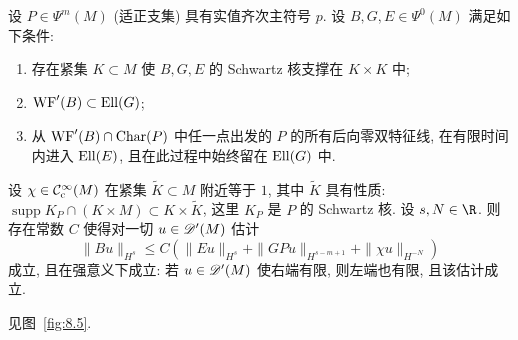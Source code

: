 \begin{corollary}[半整体传播估计]\label{cor:8.19}
设 $P \in \Psi^m(M)$ (适正支集) 具有实值齐次主符号 $p$. 设 $B, G, E \in \Psi^0(M)$ 满足如下条件:
\begin{enumerate}
    \item 存在紧集 $K \subset M$ 使 $B, G, E$ 的 Schwartz 核支撑在 $K \times K$ 中;
    \item $\operatorname{WF}'(B) \subset \operatorname{Ell}(G)$;
    \item 从 $\operatorname{WF}'(B) \cap \operatorname{Char}(P)$ 中任一点出发的 $P$ 的所有后向零双特征线, 在有限时间内进入 $\operatorname{Ell}(E)$, 且在此过程中始终留在 $\operatorname{Ell}(G)$ 中.
\end{enumerate}
设 $\chi \in \mathcal{C}_{\mathrm{c}}^\infty(M)$ 在紧集 $\tilde{K} \subset M$ 附近等于 $1$, 其中 $\tilde{K}$ 具有性质: $\operatorname{supp}K_P \cap (K \times M) \subset K \times \tilde{K}$, 这里 $K_P$ 是 $P$ 的 Schwartz 核. 设 $s, N \in \R$. 则存在常数 $C$ 使得对一切 $u \in \mathscr{D}'(M)$ 估计
\begin{equation}\label{eq:8.76}
    \| B u \|_{H^s} \le C\left( \| E u \|_{H^s} + \| G P u \|_{H^{s-m+1}} + \| \chi u \|_{H^{-N}} \right)
\end{equation}
成立, 且在强意义下成立: 若 $u \in \mathscr{D}'(M)$ 使右端有限, 则左端也有限, 且该估计成立.
\end{corollary}

见图~\ref{fig:8.5}.

